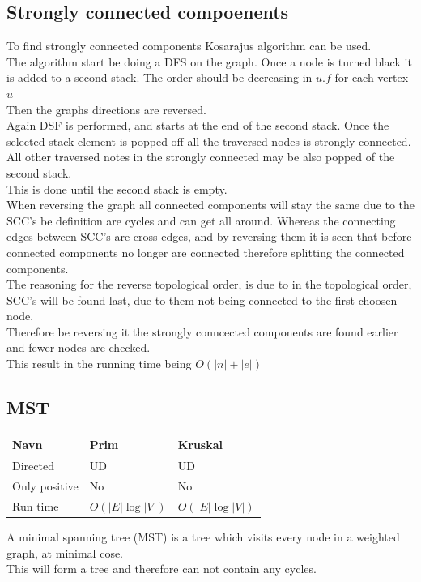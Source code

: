 \documentclass[12pt, a4paper]{article}
\begin{document}
		\subsection{Strongly connected compoenents}
			To find strongly connected components Kosarajus algorithm can be used.\\
			The algorithm start be doing a DFS on the graph. Once a node is turned black it is added to a second stack. The order should be decreasing in $u.f$ for each vertex $u$\\
			Then the graphs directions are reversed.\\
			Again DSF is performed, and starts at the end of the second stack. Once the selected stack element is popped off all the traversed nodes is strongly connected.\\
			All other traversed notes in the strongly connected may be also popped of the second stack.\\
			This is done until the second stack is empty.\\
			When reversing the graph all connected components will stay the same due to the SCC's be definition are cycles and can get all around. Whereas the connecting edges between SCC's are cross edges, and by reversing them it is seen that before connected components no longer are connected therefore splitting the connected components.\\
			The reasoning for the reverse topological order, is due to in the topological order, SCC's will be found last, due to them not being connected to the first choosen node.\\
			Therefore be reversing it the strongly conncected components are found earlier and fewer nodes are checked.\\
			This result in the running time being $O(|n|+|e|)$
		\subsection{MST}
		\begin{table}[h!]
				  \begin{tabular}{|l|l|l|}
							 \hline
							 Navn & Prim  & Kruskal  \\ \hline
							 Directed & UD  & UD\\ \hline
							 Only positive & No  & No\\ \hline
							 Run time & $O(|E|\log |V|)$  & $O(|E|\log |V|)$ \\ \hline
				  \end{tabular}
		\end{table}
			A minimal spanning tree (MST) is a tree which visits every node in a weighted graph, at minimal cose.\\
			This will form a tree and therefore can not contain any cycles.\\
\end{document}
